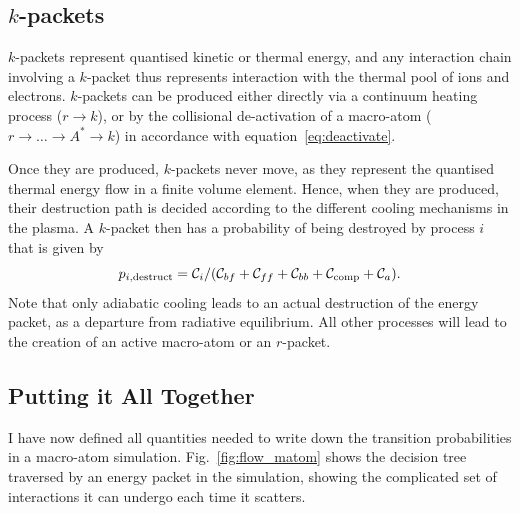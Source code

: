 \noindent

\subsection{$k$-packets}
$k$-packets represent quantised kinetic or thermal energy, and any interaction
chain involving a $k$-packet thus represents interaction with the thermal
pool of ions and electrons. $k$-packets can be produced either directly
via a continuum heating process ($r \rightarrow k$), 
or by the collisional de-activation of a macro-atom 
($r \rightarrow \ldots \rightarrow A^* \rightarrow k$) in accordance with
equation~\ref{eq:deactivate}. 

Once they are produced, $k$-packets never move, as they represent the quantised
thermal energy flow in a finite volume element. Hence, when they are produced,
their destruction path is decided according to the different cooling mechanisms
in the plasma. A $k$-packet then has a probability of being destroyed by process $i$ that
is given by
\begin{equation}
p_{i,\mathrm{destruct}} = {\cal C}_i / ({\cal C}_{bf} + {\cal C}_{ff} + {\cal C}_{bb} + {\cal C}_{\mathrm{comp}} + {\cal C}_a).
\end{equation}
Note that only adiabatic cooling leads to an actual destruction of the energy packet,
as a departure from radiative equilibrium. All other processes will lead to the 
creation of an active macro-atom or an $r$-packet.



\subsection{Putting it All Together}

I have now defined all quantities needed to write down the transition 
probabilities in a macro-atom simulation. Fig.~\ref{fig:flow_matom}
shows the decision tree traversed by an energy packet in the simulation,
showing the complicated set of interactions it can undergo each time it 
scatters.

